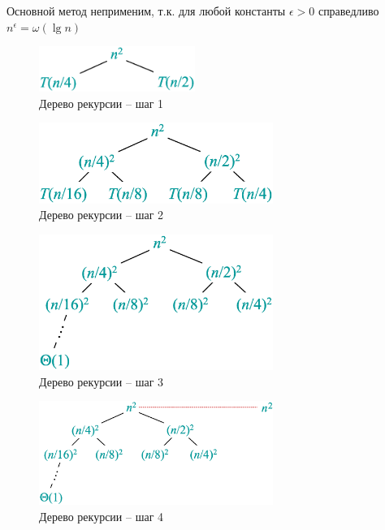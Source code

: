 \documentclass[11pt]{article}
\begin{document}
Основной метод неприменим, т.к. для любой константы $\epsilon > 0$ справедливо $n^{\epsilon} = \omega({\lg n})$

\pagebreak
\begin{figure}[p]
  \centering
  \includegraphics[width=2in]{lecture2/tree1.eps}
  \caption{Дерево рекурсии -- шаг 1}
  \label{fig:rectree1}
\end{figure}

\begin{figure}[p]
  \centering
  \includegraphics[width=3in]{lecture2/tree2.eps}
  \caption{Дерево рекурсии -- шаг 2}
  \label{fig:rectree2}
\end{figure}

\begin{figure}[p]
  \centering
  \includegraphics[width=3in]{lecture2/tree3.eps}
  \caption{Дерево рекурсии -- шаг 3}
  \label{fig:rectree3}
\end{figure}

\begin{figure}[p]
  \centering
  \includegraphics[width=3in]{lecture2/tree4.eps}
  \caption{Дерево рекурсии -- шаг 4}
  \label{fig:rectree4}
\end{figure}
\end{document}
